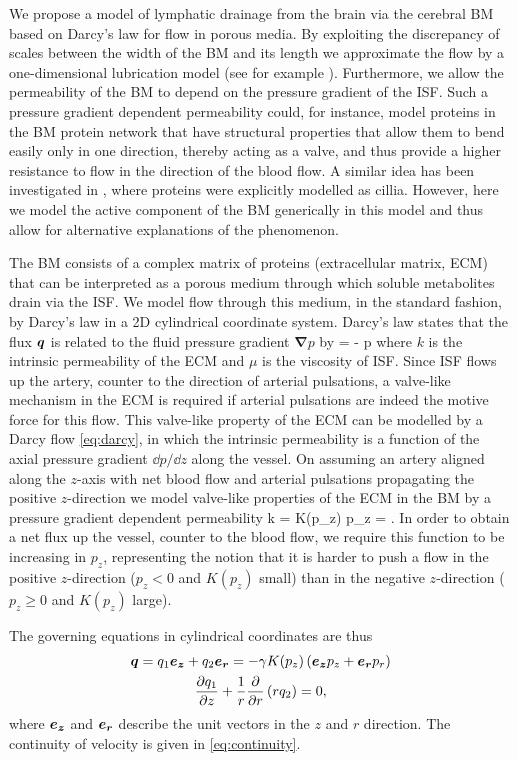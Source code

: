 \documentclass[a4paper,titlepage]{scrartcl}
\begin{document}
We propose a model of lymphatic drainage from the brain via the cerebral BM based on Darcy's law for flow in porous media. By exploiting the discrepancy of scales between the width of the BM and its length we approximate the flow by a one-dimensional lubrication model (see for example \cite{Ockendon1995}). Furthermore, we allow the permeability of the BM to depend on the pressure gradient of the ISF. Such a pressure gradient dependent permeability could, for instance, model proteins in the BM protein network that have structural properties that allow them to bend easily only in one direction, thereby acting as a valve, and thus provide a higher resistance to flow in the direction of the blood flow. A similar idea has been investigated in \cite{Sharp2015}, where proteins were explicitly modelled as cillia. However, here we model the active component of the BM generically in this model and thus allow for alternative explanations of the phenomenon.

The BM consists of a complex matrix of proteins (extracellular matrix, ECM) that can be interpreted as a porous medium through which soluble metabolites drain via the ISF. We model flow through this medium, in the standard fashion, by Darcy's law in a 2D cylindrical coordinate system. Darcy's law states that the flux $\boldsymbol{q}$ is related to the fluid pressure gradient $\boldsymbol{\nabla} p$ by
\beq\label{eq:darcy}
  \q = - \boldsymbol{\nabla} p
\eeq
where $k$ is the intrinsic permeability of the ECM and $\mu$ is the viscosity of ISF. Since ISF flows up the artery, counter to the direction of arterial pulsations, a valve-like mechanism in the ECM is required if arterial pulsations are indeed the motive force for this flow. This valve-like property of the ECM can be modelled by a Darcy flow \eqref{eq:darcy}, in which the intrinsic permeability is a function of the axial pressure gradient $\dd p / \dd z$ along the vessel. On assuming an artery aligned along the $z$-axis with net blood flow and arterial pulsations propagating the positive $z$-direction we model valve-like properties of the ECM in the BM by a pressure gradient dependent permeability
\beq
k = \mu K(p_z) \qquad {} p_z = .
\eeq
In order to obtain a net flux up the vessel, counter to the blood flow, we require this function to be increasing in $p_z$, representing the notion that it is harder to push a flow in the positive $z$-direction ($p_z < 0$ and $K(p_z)$ small) than in the negative $z$-direction ($p_z \geq 0$ and $K(p_z)$ large).

The governing equations in cylindrical coordinates are thus
\begin{gather}
  \boldsymbol{q} = q_1 \boldsymbol{e_z} + q_2 \boldsymbol{e_r} = - \gamma K(p_z) \left( \boldsymbol{e_z} p_z + \boldsymbol{e_r} p_r \right) \label{eq:darcy_velocity}\\
  \frac{\partial q_1}{\partial z} + \frac{1}{r} \frac{\partial}{\partial r} \left( r q_2 \right) = 0 \label{eq:continuity},
\end{gather}
where $\boldsymbol{e_z}$ and $\boldsymbol{e_r}$ describe the unit vectors in the $z$ and $r$ direction. The continuity of velocity is given in \eqref{eq:continuity}.
\end{document}
